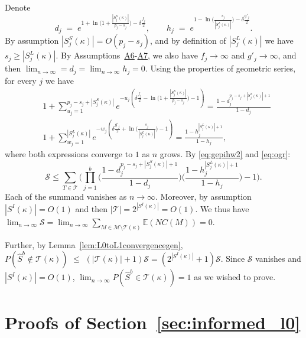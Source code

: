 \documentclass[bj,authoryear]{imsart}
\theoremstyle{plain}
\newcommand{\E}{\mathbb{E}}
\newcommand{\M}{\mathcal{M}}
\newcommand{\T}{\mathcal{T}}
\begin{document}
Denote
$$
d_j\;=\;e^{1+\ln\big(1+\frac{|S^{S}_j(\kappa)|}{p_j-s_j}\big)-\delta \tfrac{f_j}{2}},\qquad h_j\;=\;e^{1-\ln\big(\frac{s_j}{|S_j^{L}(\kappa)|}\big)-\delta \tfrac{g'_j}{2}}.
$$
By assumption $|S^{S}_j(\kappa)|=O(p_j-s_j)$, and by definition of $|S_j^{L}(\kappa)|$ we have $s_j\geq|S_j^{L}(\kappa)|$. By Assumptions~\hyperlink{lab:A6}{A6}-\hyperlink{lab:A7}{A7}, we also have $f_j\to\infty$ and $g'_j\to\infty$, and then $\lim_{n \to \infty}= d_j= \lim_{n \to \infty} h_j=0$. Using the properties of geometric series, 
 for every $j$ we have
\begin{eqnarray*}
    &1+\sum_{u_j=1}^{p_j-s_j+|S_j^{S}(\kappa)|}e^{-u_j\left(\delta \tfrac{f_j}{2}-\ln\big(1+\frac{|S^{S}_j(\kappa)|}{p_j-s_j}\big)-1\right)}
    =\frac{1-d_j^{p_j-s_j+|S_j^{S}(\kappa)|+1}}{1-d_j} \\
    &1+\sum_{w_j=1}^{|S_j^{L}(\kappa)|}    e^{-w_j\left(\delta \tfrac{g'_j}{2}+\ln\big(\frac{s_j}{|S_j^{L}(\kappa)|}\big)-1\right)} =\frac{1-h_j^{|S_j^{L}(\kappa)|+1}}{1-h_j},
\end{eqnarray*}
where both expressions converge to $1$ as $n$ grows. By \eqref{eq:gepihw2} and \eqref{eq:ogr}:
$$\mathcal{S}\leq\sum_{T\in\T}\Bigg(\prod_{j=1}^b\Big(\frac{1-d_j^{p_j-s_j+|S_j^{S}(\kappa)|+1}}{1-d_j}\Big)\Big(\frac{1-h_j^{|S_j^{L}(\kappa)|+1}}{1-h_j}\Big)-1\Bigg).$$
Each of the summand vanishes as $n\to\infty$. Moreover, by assumption $|S^I(\kappa)|=O(1)$ and then $|\T|=2^{|S^I(\kappa)|}=O(1)$. We thus have $\lim_{n\to\infty}\mathcal{S}=\lim_{n\to\infty}\sum_{M \in \M\setminus \T(\kappa)} \E\left(NC(M)\right)=0$.

Further, by Lemma~\ref{lem:L0toL1convergencegen}, 
$P(\hat{S}^{b} \not\in \T(\kappa) ) \,\,\leq \,\, (|\T(\kappa)|+1) \mathcal{S} = (2^{|S^{I}(\kappa)|}+1) \mathcal{S}$. Since $\mathcal{S}$ vanishes and $|S^{I}(\kappa)|=O(1)$, $\lim_{n\to\infty}P(\hat{S}^{b} \in \T(\kappa) )=1$ as we wished to prove.


\section{Proofs of Section~\ref{sec:informed_l0}}\label{suppsec:proofsempbayes}
\end{document}
